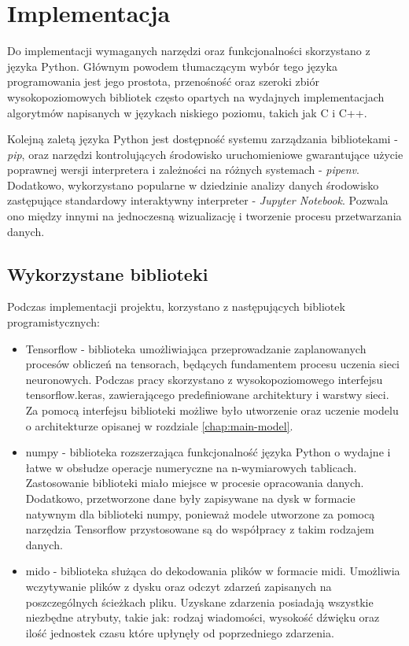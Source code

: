 \chapter{Implementacja}\label{chap:impl}
{
    Do implementacji wymaganych narzędzi oraz funkcjonalności skorzystano z języka Python. Głównym powodem tłumaczącym wybór tego języka programowania jest jego prostota, przenośność oraz szeroki zbiór wysokopoziomowych bibliotek często opartych na wydajnych implementacjach algorytmów napisanych w językach niskiego poziomu, takich jak C i C++. 

    Kolejną zaletą języka Python jest dostępność systemu zarządzania bibliotekami - {\textit {pip}}, oraz narzędzi kontrolujących środowisko uruchomieniowe gwarantujące użycie poprawnej wersji interpretera i zależności na różnych systemach - {\textit {pipenv}}. Dodatkowo, wykorzystano popularne w dziedzinie analizy danych środowisko zastępujące standardowy interaktywny interpreter - {\textit {Jupyter Notebook}}. Pozwala ono między innymi na jednoczesną wizualizację i tworzenie procesu przetwarzania danych. 

    \section{Wykorzystane biblioteki}
    {
        Podczas implementacji projektu, korzystano z następujących bibliotek programistycznych:
        \begin{itemize}
            \setlength\itemsep{-0.5em}
            \item Tensorflow - biblioteka umożliwiająca przeprowadzanie zaplanowanych procesów obliczeń na tensorach, będących fundamentem procesu uczenia sieci neuronowych. Podczas pracy skorzystano z wysokopoziomowego interfejsu tensorflow.keras, zawierającego predefiniowane architektury i warstwy sieci. Za pomocą interfejsu biblioteki możliwe było utworzenie oraz uczenie modelu o architekturze opisanej w rozdziale \ref{chap:main-model}.
            \item numpy - biblioteka rozszerzająca funkcjonalność języka Python o wydajne i łatwe w obsłudze operacje numeryczne na n-wymiarowych tablicach. Zastosowanie biblioteki miało miejsce w procesie opracowania danych. Dodatkowo, przetworzone dane były zapisywane na dysk w formacie natywnym dla biblioteki numpy, ponieważ modele utworzone za pomocą narzędzia Tensorflow przystosowane są do współpracy z takim rodzajem danych.
            \item mido - biblioteka służąca do dekodowania plików w formacie midi. Umożliwia wczytywanie plików z dysku oraz odczyt zdarzeń zapisanych na poszczególnych ścieżkach pliku. Uzyskane zdarzenia posiadają wszystkie niezbędne atrybuty, takie jak: rodzaj wiadomości, wysokość dźwięku oraz ilość jednostek czasu które upłynęły od poprzedniego zdarzenia.
        \end{itemize}
    }

}
